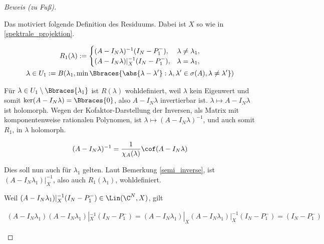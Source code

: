 \begin{proof}[Beweis (zu Fuß)]
\begin{enumerate}[label = (\roman*)]
        Das motiviert folgende Definition des Residuums.
        Dabei ist $X$ so wie in \ref{spektrale_projektion}.

        \begin{multline*}
            R_1(\lambda)
            :=
            \begin{cases}
                (A - I_N \lambda)    ^{-1} (I_N - P_1^-), & \lambda \neq \lambda_1, \\
                (A - I_N \lambda) |_X^{-1} (I_N - P_1^-), & \lambda =    \lambda_1, \\
            \end{cases} \\
            \lambda
            \in
            U_1
            :=
            B
            (
                \lambda_1,
                \min
                \Bbraces
                {
                    \abs{\lambda - \lambda^\prime}:
                    \lambda, \lambda^\prime \in \sigma(A),
                    \lambda \neq \lambda^\prime
                }
            )
        \end{multline*}

        Für $\lambda \in U_1 \setminus \Bbraces{\lambda_1}$ ist $R(\lambda)$ wohldefiniert, weil $\lambda$ kein Eigenwert und somit $\ker (A - I_N \lambda) = \Bbraces{0}$, also $A - I_N \lambda$ invertierbar ist.
        $\lambda \mapsto A - I_N \lambda$ ist holomorph.
        Wegen der Kofaktor-Darstellung der Inversen, als Matrix mit komponentenweise rationalen Polynomen, ist $\lambda \mapsto (A - I_N \lambda)^{-1}$, und auch somit $R_1$, in $\lambda$ holomorph.

        \begin{align*}
            (A - I_N \lambda)^{-1}
            =
            \frac{1}{\chi_A(\lambda)}
            \cof (A - I_N \lambda)
        \end{align*}

        Dies soll nun auch für $\lambda_1$ gelten.
        Laut Bemerkung \ref{semi_inverse}, ist $(A - I_N \lambda_1) |_X^{-1}$, also auch $R_1(\lambda_1)$, wohldefiniert.

        Weil $(A - I_N \lambda_1) |_X^{-1} (I_N - P_1^-) \in \Lin(\C^N, X)$, gilt

        \begin{align*}
            (A - I_N \lambda_1)
            (A - I_N \lambda_1) |_X^{-1}
            (I_N - P_1^-)
            =
            (A - I_N \lambda_1) |_X
            (A - I_N \lambda_1) |_X^{-1}
            (I_N - P_1^-)
            =
            (I_N - P_1^-)
        \end{align*}


\end{enumerate}
\end{proof}
